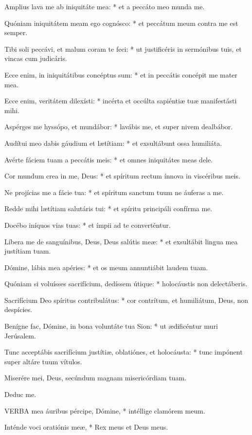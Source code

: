 Amplius lava me ab iniquitáte mea: * et a peccáto meo munda me.

Quóniam iniquitátem meam ego cognósco: * et peccátum meum contra me est semper.

Tibi soli peccávi, et malum coram te feci: * ut justificéris in sermónibus tuis, et vincas cum judicáris.

Ecce enim, in iniquitátibus concéptus sum: * et in peccátis concépit me mater mea.

Ecce enim, veritátem dilexísti: * incérta et occúlta sapiéntiæ tuæ manifestásti mihi.

Aspérges me hyssópo, et mundábor: * lavábis me, et super nivem dealbábor.

Audítui meo dabis gáudium et lætítiam: * et exsultábunt ossa humiliáta.

Avérte fáciem tuam a peccátis meis: * et omnes iniquitátes meas dele.

Cor mundum crea in me, Deus: * et spíritum rectum ínnova in viscéribus meis.

Ne projícias me a fácie tua: * et spíritum sanctum tuum ne áuferas a me.

Redde mihi lætítiam salutáris tui: * et spíritu principáli confírma me.

Docébo iníquos vias tuas: * et ímpii ad te converténtur.

Líbera me de sanguínibus, Deus, Deus salútis meæ: * et exsultábit lingua mea justítiam tuam.

Dómine, lábia mea apéries: * et os meum annuntiábit laudem tuam.

Quóniam si voluísses sacrifícium, dedíssem útique: * holocáustis non delectáberis.

Sacrifícium Deo spíritus contribulátus: * cor contrítum, et humiliátum, Deus, non despícies.

Benígne fac, Dómine, in bona voluntáte tua Sion: * ut ædificéntur muri Jerúsalem.

Tunc acceptábis sacrifícium justítiæ, oblatiónes, et holocáusta: * tunc impónent super altáre tuum vítulos.

 Miserére mei, Deus, secúndum magnam misericórdiam tuam.

 Deduc me.


\lettrine[lines=2]{V}{ERBA} mea áuribus pércipe, Dómine, * intéllige clamórem meum.

Inténde voci oratiónis meæ, * Rex meus et Deus meus.

